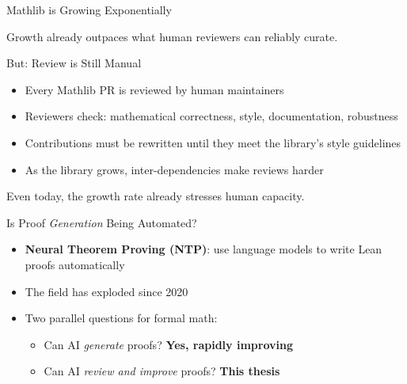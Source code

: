 \documentclass{beamer}
\newcommand{\highlight}[1]{\textcolor{improverOrange}{\textbf{#1}}}
\newcommand{\good}[1]{\textcolor{improverGreen}{\textbf{#1}}}
\begin{document}
\begin{frame}{Mathlib is Growing Exponentially}
\begin{center}
\end{center}
\vspace{0.3em}
\small Growth already outpaces what human reviewers can reliably curate.
\end{frame}

\begin{frame}{But: Review is Still Manual}
\vspace{0.8em}
\begin{itemize}\setlength{\itemsep}{10pt}
  \item Every Mathlib PR is reviewed by human maintainers
  \item Reviewers check: mathematical correctness, style, documentation, robustness
  \item Contributions must be rewritten until they meet the library's style guidelines
  \item As the library grows, inter-dependencies make reviews harder
\end{itemize}
\vspace{0.8em}
\begin{alertblock}{}
  \centering Even today, the growth rate already stresses human capacity.
\end{alertblock}
\end{frame}

\begin{frame}{Is Proof \emph{Generation} Being Automated?}
\vspace{0.8em}
\begin{itemize}\setlength{\itemsep}{10pt}
  \item \textbf{Neural Theorem Proving (NTP)}: use language models to write Lean proofs automatically
  \item The field has exploded since 2020
  \item Two parallel questions for formal math:
    \begin{itemize}\setlength{\itemsep}{5pt}
      \item Can AI \emph{generate} proofs? \good{Yes, rapidly improving}
      \item Can AI \emph{review and improve} proofs? \highlight{This thesis}
    \end{itemize}
\end{itemize}
\end{frame}
\end{document}
